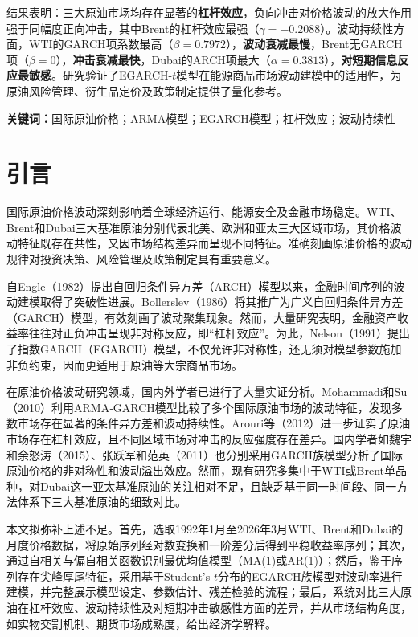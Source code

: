 \documentclass[12pt,a4paper]{ctexart}
\begin{document}
结果表明：三大原油市场均存在显著的\textbf{杠杆效应}，负向冲击对价格波动的放大作用强于同幅度正向冲击，其中Brent的杠杆效应最强（$\gamma = -0.2088$）。波动持续性方面，WTI的GARCH项系数最高（$\beta = 0.7972$），\textbf{波动衰减最慢}，Brent无GARCH项（$\beta=0$），\textbf{冲击衰减最快}，Dubai的ARCH项最大（$\alpha = 0.3813$），\textbf{对短期信息反应最敏感}。研究验证了EGARCH-$t$模型在能源商品市场波动建模中的适用性，为原油风险管理、衍生品定价及政策制定提供了量化参考。

\vspace{0.5em}
\noindent\textbf{ 关键词：}国际原油价格；ARMA模型；EGARCH模型；杠杆效应；波动持续性


\newpage
\tableofcontents%

\newpage
\section{引言}

国际原油价格波动深刻影响着全球经济运行、能源安全及金融市场稳定。WTI、Brent和Dubai三大基准原油分别代表北美、欧洲和亚太三大区域市场，其价格波动特征既存在共性，又因市场结构差异而呈现不同特征。准确刻画原油价格的波动规律对投资决策、风险管理及政策制定具有重要意义。

自Engle（1982）提出自回归条件异方差（ARCH）模型以来，金融时间序列的波动建模取得了突破性进展。Bollerslev（1986）将其推广为广义自回归条件异方差（GARCH）模型，有效刻画了波动聚集现象。然而，大量研究表明，金融资产收益率往往对正负冲击呈现非对称反应，即“杠杆效应”。为此，Nelson（1991）提出了指数GARCH（EGARCH）模型，不仅允许非对称性，还无须对模型参数施加非负约束，因而更适用于原油等大宗商品市场。

在原油价格波动研究领域，国内外学者已进行了大量实证分析。Mohammadi和Su（2010）利用ARMA‑GARCH模型比较了多个国际原油市场的波动特征，发现多数市场存在显著的条件异方差和波动持续性。Arouri等（2012）进一步证实了原油市场存在杠杆效应，且不同区域市场对冲击的反应强度存在差异。国内学者如魏宇和余怒涛（2015）、张跃军和范英（2011）也分别采用GARCH族模型分析了国际原油价格的非对称性和波动溢出效应。然而，现有研究多集中于WTI或Brent单品种，对Dubai这一亚太基准原油的关注相对不足，且缺乏基于同一时间段、同一方法体系下三大基准原油的细致对比。

本文拟弥补上述不足。首先，选取1992年1月至2026年3月WTI、Brent和Dubai的月度价格数据，将原始序列经对数变换和一阶差分后得到平稳收益率序列；其次，通过自相关与偏自相关函数识别最优均值模型（MA(1)或AR(1)）；然后，鉴于序列存在尖峰厚尾特征，采用基于Student's $t$分布的EGARCH族模型对波动率进行建模，并完整展示模型设定、参数估计、残差检验的流程；最后，系统对比三大原油在杠杆效应、波动持续性及对短期冲击敏感性方面的差异，并从市场结构角度，如实物交割机制、期货市场成熟度，给出经济学解释。
\end{document}
